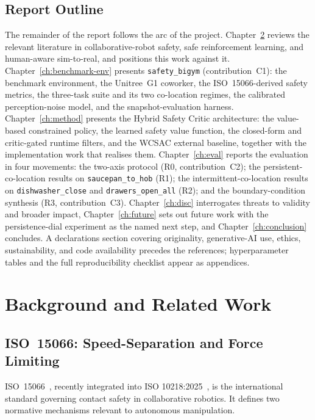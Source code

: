 \documentclass[11pt,a4paper]{report}
\newcommand{\iso}{ISO~15066}
\newcommand{\sbigym}{\texttt{safety\_bigym}}
\begin{document}
\section{Report Outline}
\label{sec:intro:outline}

The remainder of the report follows the arc of the project.
Chapter~\ref{ch:background} reviews the relevant literature in
collaborative-robot safety, safe reinforcement learning, and
human-aware sim-to-real, and positions this work against it.
Chapter~\ref{ch:benchmark-env} presents \sbigym{} (contribution~C1):
the benchmark environment, the Unitree~G1 coworker, the
\iso{}-derived safety metrics, the three-task suite and its two
co-location regimes, the calibrated perception-noise model, and the
snapshot-evaluation harness. Chapter~\ref{ch:method} presents the
Hybrid Safety Critic architecture: the value-based constrained
policy, the learned safety value function, the closed-form and
critic-gated runtime filters, and the WCSAC external baseline,
together with the implementation work that realises them.
Chapter~\ref{ch:eval} reports the evaluation in four movements: the
two-axis protocol (R0, contribution~C2); the persistent-co-location
results on \texttt{saucepan\_to\_hob} (R1); the
intermittent-co-location results on \texttt{dishwasher\_close} and
\texttt{drawers\_open\_all} (R2); and the boundary-condition
synthesis (R3, contribution~C3). Chapter~\ref{ch:disc} interrogates
threats to validity and broader impact, Chapter~\ref{ch:future} sets
out future work with the persistence-dial experiment as the named
next step, and Chapter~\ref{ch:conclusion} concludes. A declarations
section covering originality, generative-AI use, ethics,
sustainability, and code availability precedes the references;
hyperparameter tables and the full reproducibility checklist appear
as appendices.


\chapter{Background and Related Work}
\label{ch:background}

\section{\iso{}: Speed-Separation and Force Limiting}
\label{sec:bg:iso}

\iso{}~\cite{iso15066}, recently integrated into ISO
10218:2025~\cite{iso10218,hartmann2026iso}, is the international standard governing
contact safety in collaborative robotics. It defines two normative
mechanisms relevant to autonomous manipulation.
\end{document}
